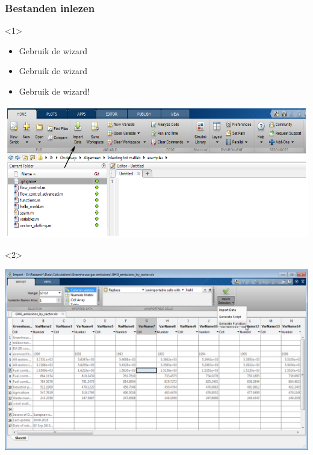 \documentclass[t]{beamer}
\begin{document}
\begin{frame}
	\frametitle{Bestanden inlezen}
\begin{onlyenv}<1>
	\begin{itemize}
		\item Gebruik de wizard
		\item Gebruik de wizard
		\item Gebruik de wizard!
	\end{itemize}
	
	\center
	\includegraphics[height=0.5\textheight]{fig/import}
	
\end{onlyenv}
\begin{onlyenv}<2>

	\center
	\includegraphics[width=\textwidth]{fig/importwizard}
	
\end{onlyenv}
\end{frame}  	
\end{document}
